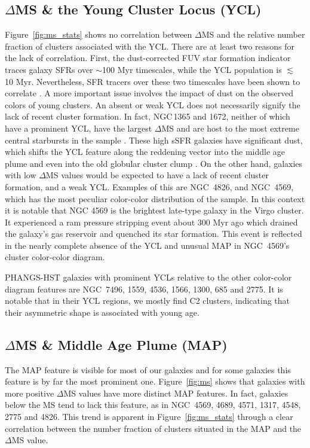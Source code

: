 \documentclass[]{aastex631}
\begin{document}
\subsection{$\Delta$MS \& the Young Cluster Locus (YCL)}\label{sec:ycl}
Figure~\ref{fig:ms_stats} shows no correlation between $\Delta$MS and the relative number fraction of clusters associated with the YCL. There are at least two reasons for the lack of correlation.  First, the dust-corrected FUV star formation indicator traces galaxy SFRs over $\sim$100 Myr timescales, while the YCL population is $\lesssim$ 10 Myr.  Nevertheless, SFR tracers over these two timescales have been shown to correlate \citep[e.g.,][and references therein]{salim_uv_2007, lee_comparison_2009}.  A more important issue involves the impact of dust on the observed colors of young clusters.   An absent or weak YCL does not necessarily signify the lack of recent cluster formation.  In fact, NGC\,1365 and 1672, neither of which have a prominent YCL, have the largest $\Delta$MS and are host to the most extreme central starbursts in the sample \citep{brandt_rosat_1996, querejeta_stellar_2021, whitmore_phangs-jwst_2023}.  These high sSFR galaxies have significant dust, which shifts the YCL feature along the reddening vector into the middle age plume \citep{thilker23sed} and even into the old globular cluster clump \citep{hollyhead_studying_2015}. On the other hand, galaxies with low $\Delta$MS values would be expected to have a lack of recent cluster formation, and a weak YCL.  Examples of this are NGC~4826, and NGC~4569, which has the most peculiar color-color distribution of the sample.  In this context it is notable that NGC 4569 is the brightest late-type galaxy in the Virgo cluster.  It experienced a ram pressure stripping event about 300 Myr ago \citep{vollmer_ngc_2004,crowl_stellar_2008,boselli_spectacular_2016} which drained the galaxy's gas reservoir and quenched its star formation.  This event is reflected in the nearly complete absence of the YCL and unusual MAP in NGC~4569's cluster color-color diagram.

PHANGS-HST galaxies with prominent YCLs relative to the other color-color diagram features are
NGC~7496, 1559, 4536, 1566, 1300, 685 and 2775. It is notable that in their YCL regions, we mostly find C2 clusters, indicating that their asymmetric shape is associated with young age.  

\subsection{$\Delta$MS \& Middle Age Plume (MAP)}\label{sec:map}
The MAP feature is visible for most of our galaxies and for some galaxies this feature is by far the most prominent one. 
Figure~\ref{fig:ms} shows that galaxies with more positive $\Delta$MS values have more distinct MAP features. In fact, galaxies below the MS tend to lack this feature, as in NGC~4569, 4689, 4571, 1317, 4548, 2775 and 4826. 
This trend is apparent in Figure~\ref{fig:ms_stats} through a clear correlation between the number fraction of clusters situated in the MAP and the $\Delta$MS value. 
\end{document}
